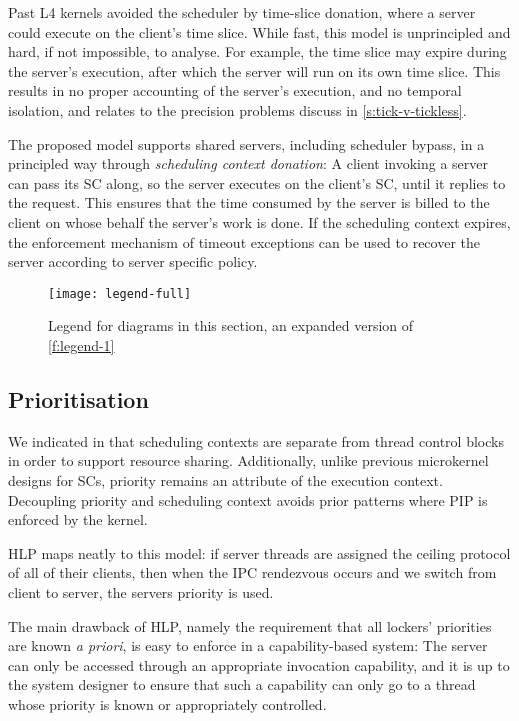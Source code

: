 Past L4 kernels avoided the scheduler by time-slice donation, where a
server could execute on the client's time slice. While fast, this
model is unprincipled and hard, if not impossible, to
analyse. For example, the time slice may expire during the server's
execution, after which the server will run on its own time slice.
This results in no proper accounting of the server's execution, and no temporal isolation, and
relates to the precision problems discuss in \cref{s:tick-v-tickless}.

The proposed model supports shared servers, including scheduler
bypass, in a principled way through \emph{scheduling context
donation}: A client invoking a server can pass its SC along, so the
server executes on the client's SC, until it replies to the
request. This ensures that the time consumed by the server is billed
to the client on whose behalf the server's work is done. If the scheduling context 
expires, the enforcement mechanism of timeout exceptions can be used to recover the server according 
to server specific policy.

\begin{figure}
    \centering
    \texttt{[image: legend-full]}
    \caption{Legend for diagrams in this section, an expanded version of \cref{f:legend-1}}
    \label{f:legend-2}
\end{figure}

\subsection{Prioritisation}

We indicated in  that scheduling contexts are separate from thread control blocks in
order to support resource sharing. Additionally, unlike previous microkernel designs for \glspl{SC}, priority
remains an attribute of the execution context. Decoupling priority and scheduling context avoids
prior patterns where \gls{PIP} is enforced by the kernel. 

\gls{HLP} maps neatly to this model: if server threads are assigned the ceiling protocol of all of
their clients, then when the \gls{IPC} rendezvous occurs and we switch from client to server, the
servers priority is used.

The main drawback of \gls{HLP}, namely the requirement that all
lockers' priorities are known \emph{a priori}, is easy to enforce in a
capability-based system: The server can only be accessed through an
appropriate invocation capability, and it is up to the system designer
to ensure that such a capability can only go to a thread whose
priority is known or appropriately controlled.

